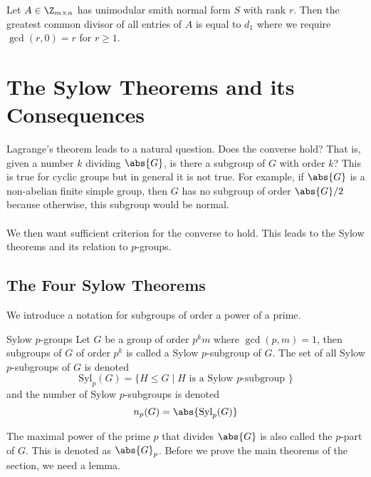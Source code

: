 \documentclass[a4paper]{article}
\begin{document}
\begin{lmm}{}{} Let $A\in\Z_{m\times n}$ has unimodular smith normal form $S$ with rank $r$. Then the greatest common divisor of all entries of $A$ is equal to $d_1$ where we require $\gcd(r,0)=r$ for $r\geq 1$. 
\end{lmm}

\pagebreak
\section{The Sylow Theorems and its Consequences}
Lagrange's theorem leads to a natural question. Does the converse hold? That is, given a number $k$ dividing $\abs{G}$, is there a subgroup of $G$ with order $k$? This is true for cyclic groups but in general it is not true. For example, if $\abs{G}$ is a non-abelian finite simple group, then $G$ has no subgroup of order $\abs{G}/2$ because otherwise, this subgroup would be normal. \\~\\

We then want sufficient criterion for the converse to hold. This leads to the Sylow theorems and its relation to $p$-groups. 
\subsection{The Four Sylow Theorems}
We introduce a notation for subgroups of order a power of a prime. 

\begin{defn}{Sylow $p$-groups}{} Let $G$ be a group of order $p^km$ where $\gcd(p,m)=1$, then subgroups of $G$ of order $p^k$ is called a Sylow $p$-subgroup of $G$. The set of all Sylow $p$-subgroups of $G$ is denoted $$\text{Syl}_p(G)=\{H\leq G\;|\;H\text{ is a Sylow }p\text{-subgroup }\}$$ and the number of Sylow $p$-subgroups is denoted $$n_p(G)=\abs{\text{Syl}_p(G)}$$ 
\end{defn}

The maximal power of the prime $p$ that divides $\abs{G}$ is also called the $p$-part of $G$. This is denoted as $\abs{G}_p$. Before we prove the main theorems of the section, we need a lemma. 
\end{document}
